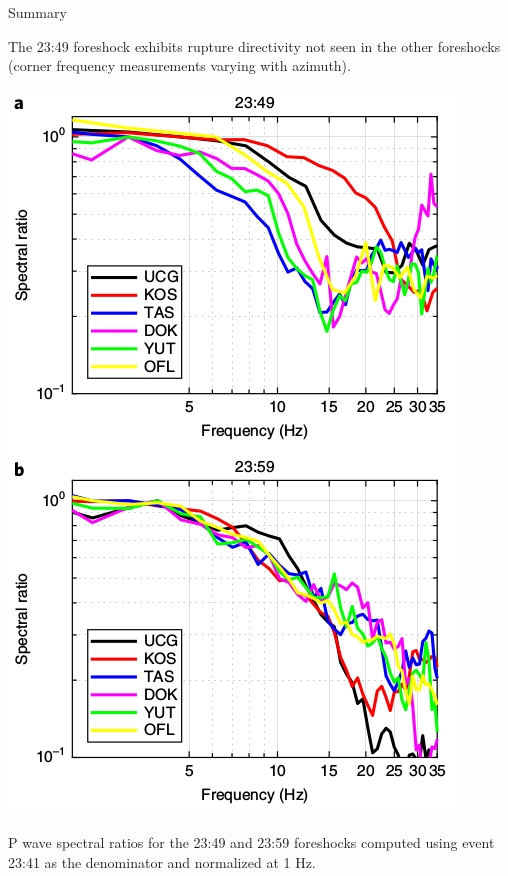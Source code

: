 \documentclass[aspectratio=43,9pt]{beamer}
\begin{document}
\begin{frame}{Summary}
 
 \begin{minipage}{0.45\linewidth}
  The 23:49 foreshock exhibits rupture directivity not seen in the other 
  foreshocks (corner frequency measurements varying with azimuth). 
 \end{minipage} \quad
 \begin{minipage}{0.45\linewidth}
  \begin{center}
  \vskip -1cm \includegraphics[height=1.5\linewidth]{Figs/fig_4ells.jpg} \\
  \end{center}

  \vskip -0.5cm
  P wave spectral ratios for the 23:49 and 23:59 foreshocks
  computed using event 23:41 as the denominator and normalized at 1 Hz.
 \end{minipage}
 
\end{frame}
\end{document}
